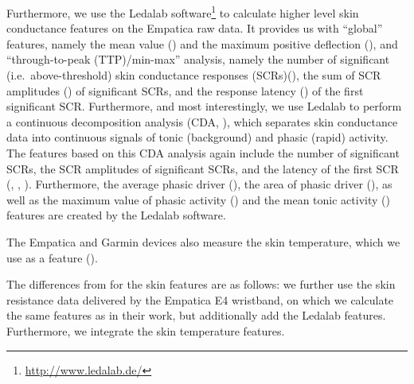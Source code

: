 \documentclass[output=paper]{langsci/langscibook}
\begin{document}
Furthermore, we use the Ledalab software\footnote{\url{http://www.ledalab.de/}} to calculate higher level skin conductance features on the Empatica raw data. It provides us with ``global'' features, namely the mean value (\ledalabGlMean{}) and the maximum positive deflection (\ledalabGlMaxDefl{}), and ``through-to-peak (TTP)/min-max'' analysis, namely the number of significant (i.e.\ above-threshold) skin conductance responses (SCRs)\linebreak (\ledalabttpnscr{}), the sum of SCR amplitudes (\ledalabttpampsum{}) of significant SCRs, and the response latency (\ledalabttplatency{}) of the first significant SCR. Furthermore, and most interestingly, we use Ledalab to perform a continuous decomposition analysis (CDA, \citealt{benedek2010ledalabCDA}), which separates skin conductance data into continuous signals of tonic (background) and phasic (rapid) activity.
The features based on this CDA analysis again include the number of significant SCRs, the SCR amplitudes of significant SCRs, and the latency of the first SCR (\ledalabcdanscr{}, \ledalabcdaampsum{}, \ledalabcdalatency{}). Furthermore, the average phasic driver (\ledalabcdascr{}), the area of phasic driver (\ledalabcdaiscr{}), as well as the maximum value of phasic activity (\ledalabcdaPhasicMax{}) and the mean tonic activity (\ledalabcdaTonic{}) features are created by the Ledalab software.

The Empatica and Garmin devices also measure the skin temperature, which we use as a feature (\skintemp{}{}). %

The differences from \citet{herbig2019mt} for the skin features are as follows: we further use the skin resistance data delivered by the Empatica E4 wristband, on which we calculate the same features as in their work, but additionally add the Ledalab features. Furthermore, we integrate the skin temperature features.
\end{document}
